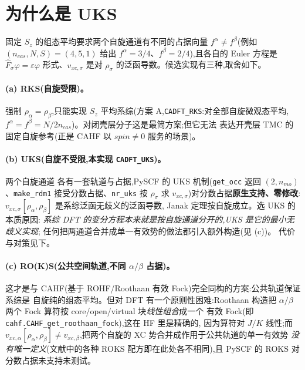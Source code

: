 \documentclass[11pt,a4paper]{ctexart}
\begin{document}
\section{为什么是 UKS}\label{sec:whyuks}

固定 $S_z$ 的组态平均要求两个自旋通道有不同的占据向量
$f^\alpha \neq f^\beta$(例如 $(n_{cas},N,S)=(4,5,1)$ 给出
$f^\alpha = 3/4$、$f^\beta = 2/4$),且各自的 Euler 方程是
$\hat F_\sigma\varphi = \varepsilon\varphi$ 形式、$v_{xc,\sigma}$ 是对
$\rho_\sigma$ 的泛函导数。候选实现有三种,取舍如下。

\paragraph{(a) RKS(自旋受限)。}强制 $\rho_\alpha=\rho_\beta$,只能实现
$S_z$ 平均系综(方案 A,\texttt{CADFT\_RKS}:对全部自旋微观态平均,
$f^\alpha = f^\beta = N/2n_{cas}$)。对闭壳层分子这是最简方案;但它无法
表达开壳层 TMC 的固定自旋参考(正是 CAHF 以 $spin\neq0$ 服务的场景)。

\paragraph{(b) UKS(自旋不受限,本实现 \texttt{CADFT\_UKS})。}两个自旋通道
各有一套轨道与占据,PySCF 的 UKS 机制(\texttt{get\_occ} 返回
$(2,n_{mo})$、\texttt{make\_rdm1} 接受分数占据、\texttt{nr\_uks} 按
$\rho_\sigma$ 求 $v_{xc,\sigma}$)对分数占据\textbf{原生支持、零修改}:
$v_{xc,\sigma}[\rho_\alpha,\rho_\beta]$ 是系综泛函无歧义的泛函导数,
Janak 定理按自旋成立。选 UKS 的本质原因:
\emph{系综 DFT 的变分方程本来就是按自旋通道分开的,UKS 是它的最小无歧义实现};
任何把两通道合并成单一有效势的做法都引入额外构造(见 (c))。
代价与对策见下。

\paragraph{(c) RO(K)S(公共空间轨道,不同 $\alpha/\beta$ 占据)。}这才是与
CAHF(基于 ROHF/Roothaan 有效 Fock)完全同构的方案:公共轨道保证系综是
自旋纯的组态平均。但对 DFT 有一个原则性困难:Roothaan 构造把
$\alpha/\beta$ 两个 Fock 算符按 core/open/virtual 块\emph{线性组合}成一个
有效 Fock(即 \texttt{cahf.CAHF\_get\_roothaan\_fock}),这在 HF 里是精确的,
因为算符对 $J/K$ 线性;而 $v_{xc,\alpha}[\rho_\alpha,\rho_\beta] \neq
v_{xc,\beta}$,把两个自旋的 XC 势合并成作用于公共轨道的单一有效势
\emph{没有唯一定义}(文献中的各种 ROKS 配方即在此处各不相同),且 PySCF 的
ROKS 对分数占据未支持未测试。
\end{document}

